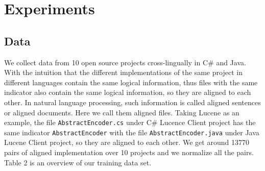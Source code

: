 \section{Experiments}


\subsection{Data}
We collect data from 10 open source projects cross-lingually in C\# and Java. With the intuition that the different implementations of the same project in different languages contain the same logical information, thus files with the same indicator also contain the same logical information, so they are aligned to each other. In natural language processing, such information is called aligned sentences or aligned documents. Here we call them aligned files. Taking Lucene as an example, the file \texttt{AbstractEncoder.cs} under C\# Lucence Client project has the same indicator \texttt{AbstractEncoder} with the file \texttt{AbstractEncoder.java} under Java Lucene Client project, so they are aligned to each other. We get around 13770 pairs of aligned implementation over 10 projects and we normalize all the pairs. Table 2 is an overview of our training data set.

